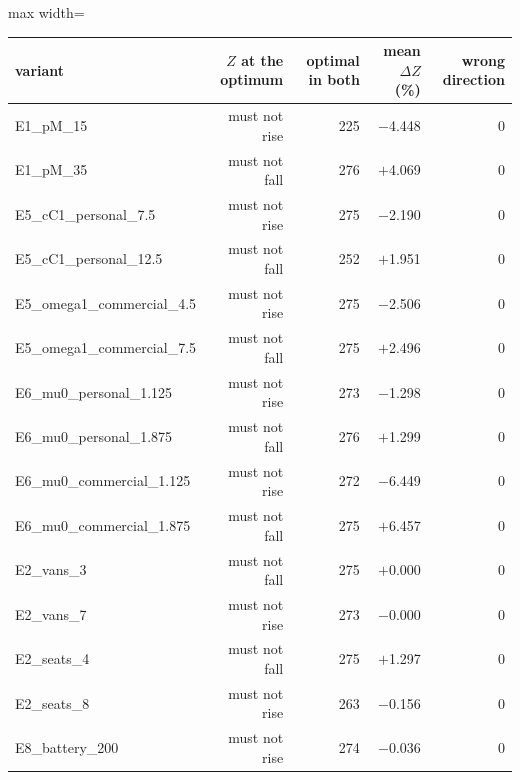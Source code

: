 \footnotesize
\begin{adjustbox}{max width=\linewidth}
\begin{tabular}{@{}lrrrr@{}}
\toprule
variant & $Z$ at the optimum & optimal in both & mean $\Delta Z$ (\%) & wrong direction \\
\midrule
E1\_pM\_15 & must not rise & 225 & $-$4.448 & 0 \\
E1\_pM\_35 & must not fall & 276 & $+$4.069 & 0 \\
E5\_cC1\_personal\_7.5 & must not rise & 275 & $-$2.190 & 0 \\
E5\_cC1\_personal\_12.5 & must not fall & 252 & $+$1.951 & 0 \\
E5\_omega1\_commercial\_4.5 & must not rise & 275 & $-$2.506 & 0 \\
E5\_omega1\_commercial\_7.5 & must not fall & 275 & $+$2.496 & 0 \\
E6\_mu0\_personal\_1.125 & must not rise & 273 & $-$1.298 & 0 \\
E6\_mu0\_personal\_1.875 & must not fall & 276 & $+$1.299 & 0 \\
E6\_mu0\_commercial\_1.125 & must not rise & 272 & $-$6.449 & 0 \\
E6\_mu0\_commercial\_1.875 & must not fall & 275 & $+$6.457 & 0 \\
E2\_vans\_3 & must not fall & 275 & $+$0.000 & 0 \\
E2\_vans\_7 & must not rise & 273 & $-$0.000 & 0 \\
E2\_seats\_4 & must not fall & 275 & $+$1.297 & 0 \\
E2\_seats\_8 & must not rise & 263 & $-$0.156 & 0 \\
E8\_battery\_200 & must not rise & 274 & $-$0.036 & 0 \\
\bottomrule
\end{tabular}
\end{adjustbox}
